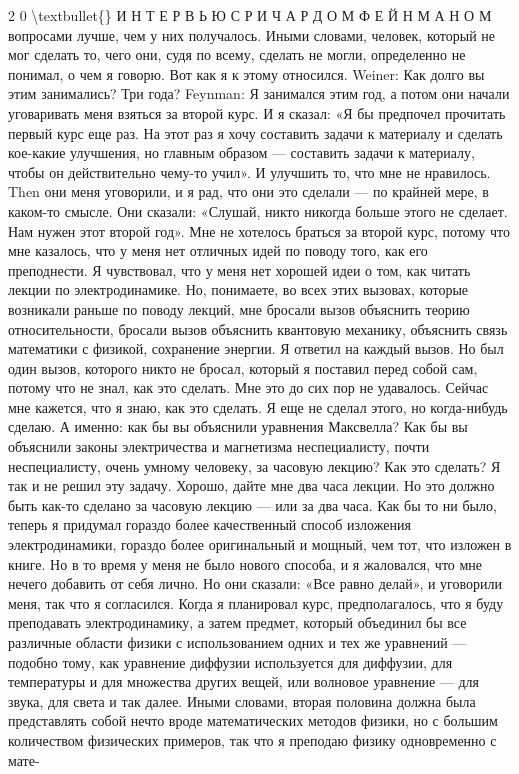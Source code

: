\documentclass[10pt,oneside]{article}
\begin{document}
2 0 \textbackslash{}textbullet\{\} И Н Т Е Р В Ь Ю  С  Р И Ч А Р Д О М  Ф Е Й Н М А Н О М вопросами лучше, чем у них получалось. Иными словами, человек, который не мог сделать то, чего они, судя по всему, сделать не могли, определенно не понимал, о чем я говорю. Вот как я к этому относился. Weiner: Как долго вы этим занимались? Три года? Feynman: Я занимался этим год, а потом они начали уговаривать меня взяться за второй курс. И я сказал: «Я бы предпочел прочитать первый курс еще раз. На этот раз я хочу составить задачи к материалу и сделать кое-какие улучшения, но главным образом --- составить задачи к материалу, чтобы он действительно чему-то учил». И улучшить то, что мне не нравилось. Then они меня уговорили, и я рад, что они это сделали --- по крайней мере, в каком-то смысле. Они сказали: «Слушай, никто никогда больше этого не сделает. Нам нужен этот второй год». Мне не хотелось браться за второй курс, потому что мне казалось, что у меня нет отличных идей по поводу того, как его преподнести. Я чувствовал, что у меня нет хорошей идеи о том, как читать лекции по электродинамике. Но, понимаете, во всех этих вызовах, которые возникали раньше по поводу лекций, мне бросали вызов объяснить теорию относительности, бросали вызов объяснить квантовую механику, объяснить связь математики с физикой, сохранение энергии. Я ответил на каждый вызов. Но был один вызов, которого никто не бросал, который я поставил перед собой сам, потому что не знал, как это сделать. Мне это до сих пор не удавалось. Сейчас мне кажется, что я знаю, как это сделать. Я еще не сделал этого, но когда-нибудь сделаю. А именно: как бы вы объяснили уравнения Максвелла? Как бы вы объяснили законы электричества и магнетизма неспециалисту, почти неспециалисту, очень умному человеку, за часовую лекцию? Как это сделать? Я так и не решил эту задачу. Хорошо, дайте мне два часа лекции. Но это должно быть как-то сделано за часовую лекцию --- или за два часа. Как бы то ни было, теперь я придумал гораздо более качественный способ изложения электродинамики, гораздо более оригинальный и мощный, чем тот, что изложен в книге. Но в то время у меня не было нового способа, и я жаловался, что мне нечего добавить от себя лично. Но они сказали: «Все равно делай», и уговорили меня, так что я согласился. Когда я планировал курс, предполагалось, что я буду преподавать электродинамику, а затем предмет, который объединил бы все различные области физики с использованием одних и тех же уравнений --- подобно тому, как уравнение диффузии используется для диффузии, для температуры и для множества других вещей, или волновое уравнение --- для звука, для света и так далее. Иными словами, вторая половина должна была представлять собой нечто вроде математических методов физики, но с большим количеством физических примеров, так что я преподаю физику одновременно с мате-\par
\end{document}
